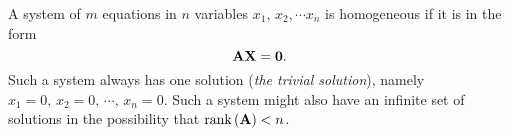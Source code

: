 

A system of $m$ equations in $n$ variables $x_1,\, x_2, \cdots x_n$ is homogeneous if it is in the form \[\mathbf{A} \mathbf{X} = \mathbf{0}.\] Such a system always has one solution (\emph{the trivial solution}), namely $x_1 = 0,\, x_2 = 0,\, \cdots,\, x_n = 0$. Such a system might also have an infinite set of solutions in the possibility that $\text{rank}\left(\mathbf{A}\right) < n$.

